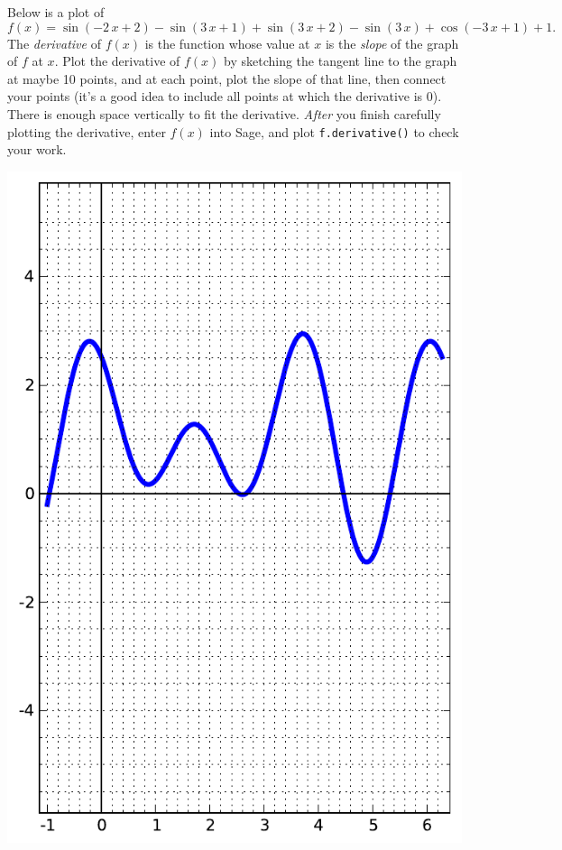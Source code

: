 Below is a plot of $$f(x)=\sin\left(-2 \, x + 2\right) - \sin\left(3 \, x + 1\right) + \sin\left(3 \, x + 2\right) - \sin\left(3 \, x\right) + \cos\left(-3 \, x + 1\right) + 1.$$  The {\em \color{red}derivative} of $f(x)$ is the function whose value at $x$ is the {\em slope} of the graph of $f$ at $x$.  Plot the derivative of $f(x)$ by sketching the tangent line to the graph at maybe 10 points, and at each point, plot the slope of that line, then connect your points (it's a good idea to include all points at which the derivative is 0).  There is enough space vertically to fit the derivative.  {\em After} you finish carefully plotting the derivative, enter $f(x)$ into Sage, and plot {\color{blue}\verb|f.derivative()|} to check your work.
\begin{center}\includegraphics{functions/20.pdf}\end{center}\newpage

